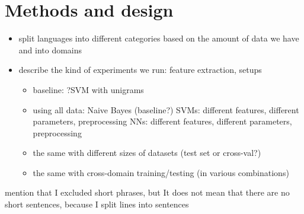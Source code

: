 \chapter{Methods and design}

\begin{itemize}
    \item split languages into different categories based on the amount of data we have and into domains
    \item describe the kind of experiments we run: feature extraction, setups
    \begin{itemize}
        \item baseline: ?SVM with unigrams
        \item using all data: \newline Naive Bayes (baseline?) \newline SVMs: different features, different parameters, preprocessing \newline NNs: different features, different parameters, preprocessing
        \item the same with different sizes of datasets (test set or cross-val?)
        \item the same with cross-domain training/testing (in various combinations)
    \end{itemize}
\end{itemize}


mention that I excluded short phrases, but It does not mean that there are no short sentences, because I split lines into sentences